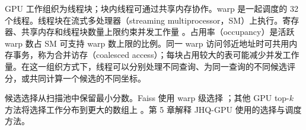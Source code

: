 GPU 工作组织为线程块；块内线程可通过共享内存协作。warp 是一起调度的 32 个线程。线程块在流式多处理器（streaming multiprocessor，SM）上执行。寄存器、共享内存和线程块数量上限约束并发工作量 \cite{cuda_programming_guide}。占用率（occupancy）是活跃 warp 数占 SM 可支持 warp 数上限的比例。同一 warp 访问邻近地址时可共用内存事务，称为合并访存（coalesced access）；每块占用较大的表可能减少并发工作量。在这一组织方式下，线程可以分别处理不同查询、为同一查询的不同候选评分，或共同计算一个候选的不同坐标。

候选选择从扫描池中保留最小分数。Faiss 使用 warp 级选择 \cite{johnson_gpu}；其他 GPU top-$k$ 方法将选择工作分布到更大的数组上 \cite{gpu_topk}。第 5 章解释 JHQ-GPU 使用的选择与调度方法。
